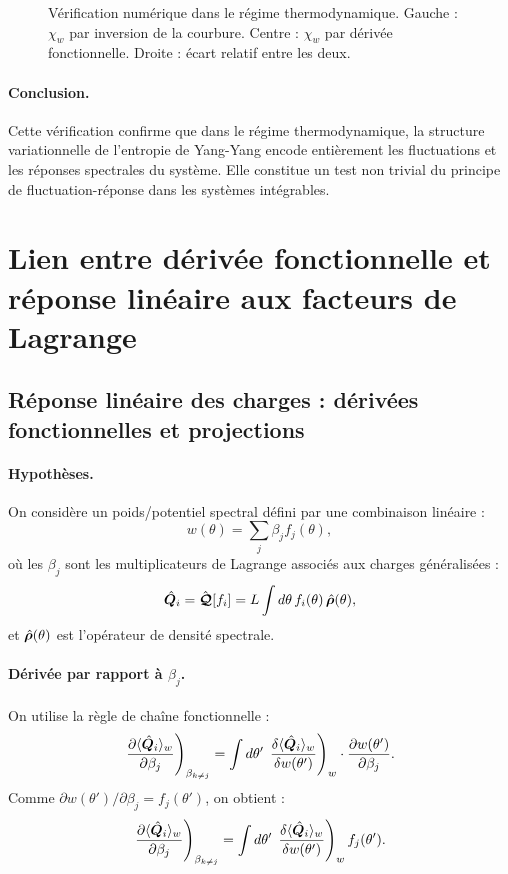 \begin{figure}[H]
    \centering
    \caption{Vérification numérique dans le régime thermodynamique. Gauche : \(\chi_w\) par inversion de la courbure. Centre : \(\chi_w\) par dérivée fonctionnelle. Droite : écart relatif entre les deux.}
    \label{fig:chi_thermodynamique}
\end{figure}

\paragraph{Conclusion.} Cette vérification confirme que dans le régime thermodynamique, la structure variationnelle de l’entropie de Yang-Yang encode entièrement les fluctuations et les réponses spectrales du système. Elle constitue un test non trivial du principe de fluctuation-réponse dans les systèmes intégrables.



\section{Lien entre dérivée fonctionnelle et réponse linéaire aux facteurs de Lagrange}

\subsection{Réponse linéaire des charges : dérivées fonctionnelles et projections} 

\paragraph{Hypothèses.}
On considère un poids/potentiel spectral défini par une combinaison linéaire :
\[
w(\theta) = \sum_j \beta_j f_j(\theta),
\]
où les \( \beta_j \) sont les multiplicateurs de Lagrange associés aux charges généralisées :
\[
\hat{\bm{Q}}_i = \hat{\bm{\mathcal{Q}}}[f_i] = L \int d\theta\, f_i(\theta)\, \hat{\bm{\rho}}(\theta),
\]
et \( \hat{\bm{\rho}}(\theta) \) est l’opérateur de densité spectrale.

\paragraph{Dérivée par rapport à \( \beta_j \).}
On utilise la règle de chaîne fonctionnelle :
\[
\left. \frac{\partial \langle \hat{\bm{Q}}_i \rangle_w }{ \partial \beta_j } \right)_{\beta_{k \ne j}} = \int d\theta'\, \left. \frac{\delta \langle \hat{\bm{Q}}_i \rangle_w }{ \delta w(\theta') } \right)_{w} \cdot \frac{\partial w(\theta')}{\partial \beta_j}.
\]
Comme \( \partial w(\theta') / \partial \beta_j = f_j(\theta') \), on obtient :
\[
\left. \frac{\partial \langle \hat{\bm{Q}}_i \rangle_w }{ \partial \beta_j } \right)_{\beta_{k \ne j}} = \int d\theta'\, \left. \frac{\delta \langle \hat{\bm{Q}}_i \rangle_w }{ \delta w(\theta') } \right)_{w} f_j(\theta').
\]

